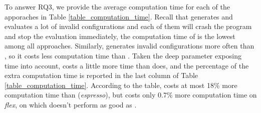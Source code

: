 
To answer RQ3, we provide the average computation time for each of the apporaches in Table \ref{table_computation_time}. Recall that \dr{} generates and evaluates a lot of invalid configurations and each of them will crash the program and stop the evaluation immediately, the computation time of \dr{} is the lowest among all approaches. Similarly, \dn{} generates invalid configurations more often than \sn{}, so it costs less computation time than \sn{}. Taken the deep parameter exposing time into account, \dn{} costs a little more time than \sn{} does, and the percentage of the extra computation time is reported in the last column of Table \ref{table_computation_time}. According to the table, \dn{} costs at most 18\% more computation time than \sn{} (\emph{espresso}), but costs only 0.7\% more computation time on \emph{flex}, on which \dn{} doesn't perform as good as \sn{}. 


